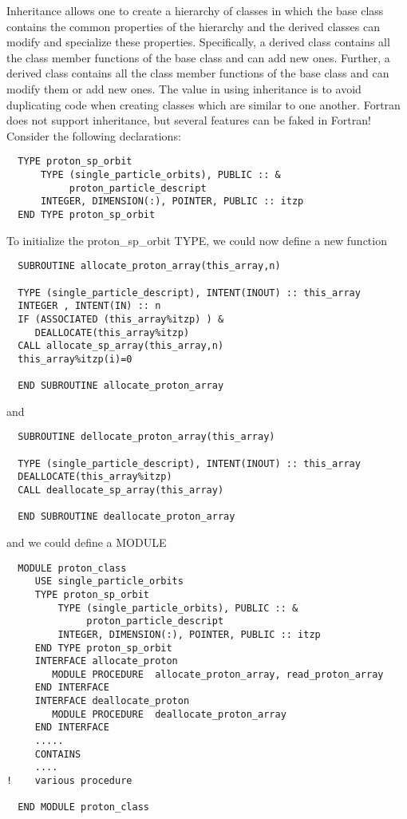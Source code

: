 Inheritance allows one to create a hierarchy of classes in which the 
base class contains the common properties of the hierarchy and the derived
classes can modify and specialize these properties. Specifically, 
a derived class contains all the class member functions of the base
class and can add new ones. Further, a derived class contains all the
class member functions of the base class and can modify them or add new
ones. The value in using inheritance is to avoid duplicating code 
when creating classes which are similar to one another.
Fortran does not support inheritance, but several features can be faked in
Fortran!  Consider the following declarations: 
\begin{lstlisting}
  TYPE proton_sp_orbit  
      TYPE (single_particle_orbits), PUBLIC :: &
           proton_particle_descript
      INTEGER, DIMENSION(:), POINTER, PUBLIC :: itzp
  END TYPE proton_sp_orbit  
\end{lstlisting}

To initialize the proton\_sp\_orbit  TYPE, we could now define
a new function
\begin{lstlisting}
  SUBROUTINE allocate_proton_array(this_array,n)

  TYPE (single_particle_descript), INTENT(INOUT) :: this_array
  INTEGER , INTENT(IN) :: n
  IF (ASSOCIATED (this_array%itzp) ) &
     DEALLOCATE(this_array%itzp)
  CALL allocate_sp_array(this_array,n) 
  this_array%itzp(i)=0

  END SUBROUTINE allocate_proton_array
\end{lstlisting}
and
\begin{lstlisting}
  SUBROUTINE dellocate_proton_array(this_array)

  TYPE (single_particle_descript), INTENT(INOUT) :: this_array
  DEALLOCATE(this_array%itzp)
  CALL deallocate_sp_array(this_array) 

  END SUBROUTINE deallocate_proton_array
\end{lstlisting}
and we could define a MODULE 
\begin{lstlisting}
  MODULE proton_class
     USE single_particle_orbits 
     TYPE proton_sp_orbit  
         TYPE (single_particle_orbits), PUBLIC :: &
              proton_particle_descript
         INTEGER, DIMENSION(:), POINTER, PUBLIC :: itzp
     END TYPE proton_sp_orbit
     INTERFACE allocate_proton
        MODULE PROCEDURE  allocate_proton_array, read_proton_array
     END INTERFACE
     INTERFACE deallocate_proton
        MODULE PROCEDURE  deallocate_proton_array
     END INTERFACE
     .....
     CONTAINS
     ....
!    various procedure
  
  END MODULE proton_class

\end{lstlisting}

